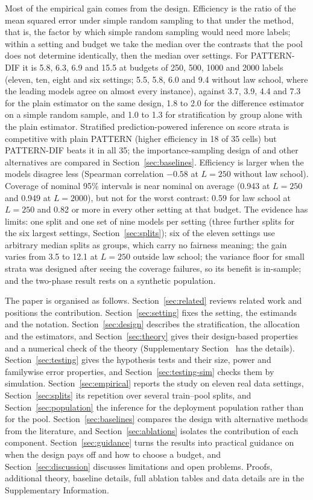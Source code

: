 Most of the empirical gain comes from the design. Efficiency is the ratio of the mean squared error under simple random sampling to that under the method, that is, the factor by which simple random sampling would need more labels; within a setting and budget we take the median over the contrasts that the pool does not determine identically, then the median over settings. For PATTERN-DIF it is 5.8, 6.3, 6.9 and 15.5 at budgets of 250, 500, 1000 and 2000 labels (eleven, ten, eight and six settings; 5.5, 5.8, 6.0 and 9.4 without law school, where the leading models agree on almost every instance), against 3.7, 3.9, 4.4 and 7.3 for the plain estimator on the same design, 1.8 to 2.0 for the difference estimator on a simple random sample, and 1.0 to 1.3 for stratification by group alone with the plain estimator. Stratified prediction-powered inference \citep{fisch2024stratppi} on score strata is competitive with plain PATTERN (higher efficiency in 18 of 35 cells) but PATTERN-DIF beats it in all 35; the importance-sampling design of \citet{sawade2012active} and other alternatives are compared in Section~\ref{sec:baselines}. Efficiency is larger when the models disagree less (Spearman correlation $-0.58$ at $L=250$ without law school). Coverage of nominal 95\% intervals is near nominal on average (0.943 at $L=250$ and 0.949 at $L=2000$), but not for the worst contrast: 0.59 for law school at $L=250$ and 0.82 or more in every other setting at that budget. The evidence has limits: one split and one set of nine models per setting (three further splits for the six largest settings, Section~\ref{sec:splits}); six of the eleven settings use arbitrary median splits as groups, which carry no fairness meaning; the gain varies from 3.5 to 12.1 at $L=250$ outside law school; the variance floor for small strata was designed after seeing the coverage failures, so its benefit is in-sample; and the two-phase result rests on a synthetic population.

The paper is organised as follows. Section~\ref{sec:related} reviews related work and positions the contribution. Section~\ref{sec:setting} fixes the setting, the estimands and the notation. Section~\ref{sec:design} describes the stratification, the allocation and the estimators, and Section~\ref{sec:theory} gives their design-based properties and a numerical check of the theory (Supplementary Section~ has the details). Section~\ref{sec:testing} gives the hypothesis tests and their size, power and familywise error properties, and Section~\ref{sec:testing-sim} checks them by simulation. Section~\ref{sec:empirical} reports the study on eleven real data settings, Section~\ref{sec:splits} its repetition over several train--pool splits, and Section~\ref{sec:population} the inference for the deployment population rather than for the pool. Section~\ref{sec:baselines} compares the design with alternative methods from the literature, and Section~\ref{sec:ablations} isolates the contribution of each component. Section~\ref{sec:guidance} turns the results into practical guidance on when the design pays off and how to choose a budget, and Section~\ref{sec:discussion} discusses limitations and open problems. Proofs, additional theory, baseline details, full ablation tables and data details are in the Supplementary Information.
